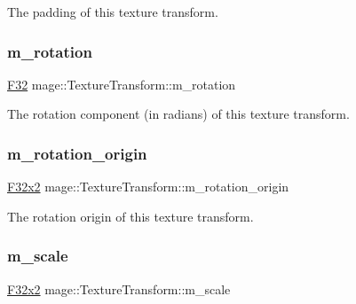 The padding of this texture transform. \hypertarget{classmage_1_1_texture_transform_aa9b56aac4354fa7f37caee42451f60d1}{}\label{classmage_1_1_texture_transform_aa9b56aac4354fa7f37caee42451f60d1} 
\subsubsection{\texorpdfstring{m\+\_\+rotation}{m\_rotation}}
{\footnotesize\ttfamily \hyperlink{namespacemage_aa97e833b45f06d60a0a9c4fc22ae02c0}{F32} mage\+::\+Texture\+Transform\+::m\+\_\+rotation\hspace{0.3cm}{\ttfamily [private]}}

The rotation component (in radians) of this texture transform. \hypertarget{classmage_1_1_texture_transform_af991dbcc669e2af4d78531b50fc60175}{}\label{classmage_1_1_texture_transform_af991dbcc669e2af4d78531b50fc60175} 
\subsubsection{\texorpdfstring{m\+\_\+rotation\+\_\+origin}{m\_rotation\_origin}}
{\footnotesize\ttfamily \hyperlink{namespacemage_aa87237ad091f5cd7da612b8523fc108f}{F32x2} mage\+::\+Texture\+Transform\+::m\+\_\+rotation\+\_\+origin\hspace{0.3cm}{\ttfamily [private]}}

The rotation origin of this texture transform. \hypertarget{classmage_1_1_texture_transform_adb36217d25494721ee54cd6807ea65af}{}\label{classmage_1_1_texture_transform_adb36217d25494721ee54cd6807ea65af} 
\subsubsection{\texorpdfstring{m\+\_\+scale}{m\_scale}}
{\footnotesize\ttfamily \hyperlink{namespacemage_aa87237ad091f5cd7da612b8523fc108f}{F32x2} mage\+::\+Texture\+Transform\+::m\+\_\+scale\hspace{0.3cm}{\ttfamily [private]}}

